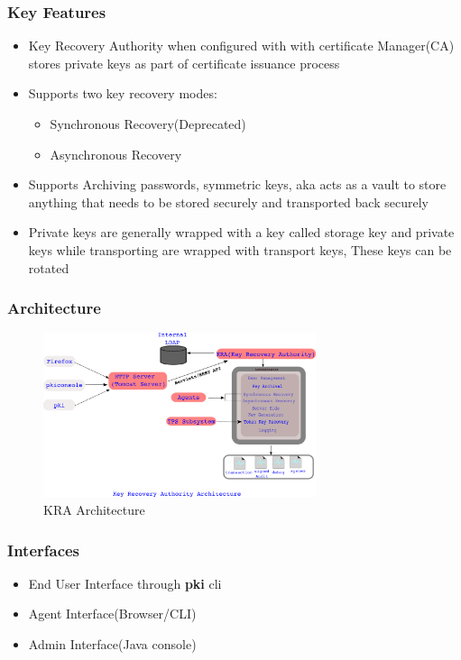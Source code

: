 \documentclass[12pt]{report}
\begin{document}
\subsubsection{Key Features}
\begin{itemize}
    \item Key Recovery Authority when configured with with certificate Manager(CA) stores private keys as part of
        certificate issuance process
    \item Supports two key recovery modes:
        \begin{itemize}
            \item Synchronous Recovery(Deprecated)
            \item Asynchronous Recovery
        \end{itemize}
    \item Supports Archiving passwords, symmetric keys, aka acts as a vault to store anything that needs
        to be stored securely and transported back securely
    \item Private keys are generally wrapped with a key called storage key and private keys
        while transporting are wrapped with transport keys, These keys can be rotated
\end{itemize}
\subsubsection{Architecture}
\begin{figure}[H]
    \centering
    \includegraphics[width=80mm]{Images/KRA-Architecture.png}
    \caption{KRA Architecture}
\end{figure}
\subsubsection{Interfaces}
\begin{itemize}
    \item End User Interface through \textbf{pki} cli
    \item Agent Interface(Browser/CLI)
    \item Admin Interface(Java console)
\end{itemize}
\end{document}
